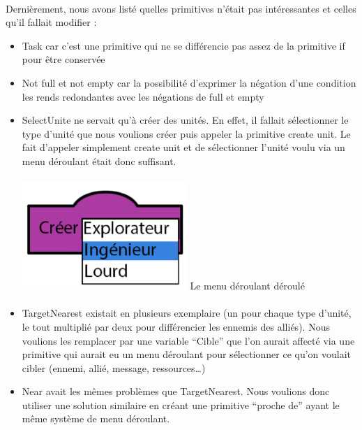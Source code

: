 \documentclass{report}
\begin{document}
\paragraph{}

  Dernièrement, nous avons listé quelles primitives n’était pas intéressantes et celles qu’il fallait modifier :
\begin{itemize}
\item Task car c’est une primitive qui ne se différencie pas assez de la primitive if pour être conservée
\item Not full et not empty car la possibilité d’exprimer la négation d’une condition les rends redondantes avec les négations de full et empty
\item SelectUnite ne servait qu’à créer des unités. En effet, il fallait sélectionner le type d’unité que nous voulions créer puis appeler la primitive create unit. Le fait d’appeler simplement create unit et de sélectionner l’unité voulu via un menu déroulant était donc suffisant.
\paragraph{}
\begin{center}
\includegraphics[scale=1]{DATA/deroulant.png}
 {Le menu déroulant déroulé}
\end{center}
\paragraph{}
\item TargetNearest existait en plusieurs exemplaire (un pour chaque type d’unité, le tout multiplié par deux pour différencier les ennemis des alliés). Nous voulions les remplacer par une variable “Cible” que l’on aurait affecté via une primitive qui aurait eu un menu déroulant pour sélectionner ce qu’on voulait cibler (ennemi, allié, message, ressources…)
\item Near avait les mêmes problèmes que TargetNearest. Nous voulions donc utiliser une solution similaire en créant une primitive “proche de” ayant le même système de menu déroulant.
\end{itemize}
\newpage
\end{document}
